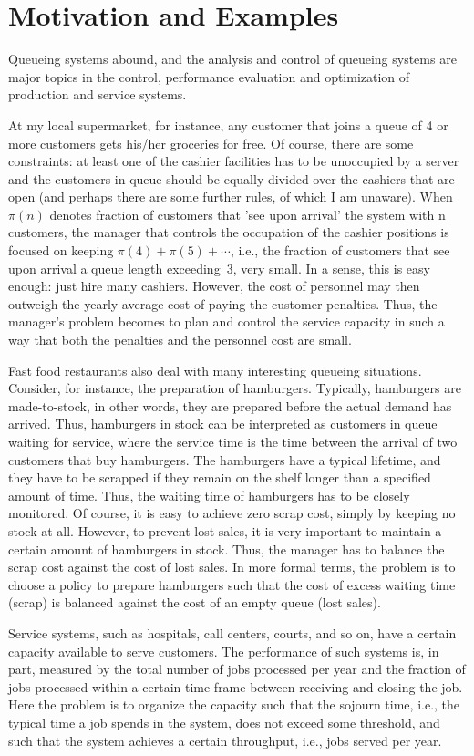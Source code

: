 \section*{Motivation and Examples}
Queueing systems abound, and the analysis and control of queueing systems are major topics in the control, performance evaluation and optimization of production and service systems.


At my local supermarket, for instance, any customer that joins a queue of 4 or more customers gets his/her groceries for free.
Of course, there are some constraints: at least one of the cashier facilities has to be unoccupied by a server and the customers in queue should be equally divided over the cashiers that are open (and perhaps there are some further rules, of which I am unaware).
When $\pi(n)$ denotes fraction of customers that 'see upon arrival' the system with n customers, the manager that controls the occupation of the cashier positions is focused on keeping $\pi(4)+\pi(5)+\cdots$, i.e., the fraction of customers that see upon arrival a queue length exceeding~3, very small.
In a sense, this is easy enough: just hire many cashiers.
However, the cost of personnel may then outweigh the yearly average cost of paying the customer penalties.
Thus, the manager's problem becomes to plan and control the service capacity in such a way that both the penalties and the personnel cost are small.

Fast food restaurants also deal with many interesting queueing situations.
Consider, for instance, the preparation of hamburgers.
Typically, hamburgers are made-to-stock, in other words, they are prepared before the actual demand has arrived.
Thus, hamburgers in stock can be interpreted as customers in queue waiting for service, where the service time is the time between the arrival of two customers that buy hamburgers.
The hamburgers have a typical lifetime, and they have to be scrapped if they remain on the shelf longer than a specified amount of time.
Thus, the waiting time of hamburgers has to be closely monitored.
Of course, it is easy to achieve zero scrap cost, simply by keeping no stock at all.
However, to prevent lost-sales, it is very important to maintain a certain amount of hamburgers in stock.
Thus, the manager has to balance the scrap cost against the cost of lost sales.
In more formal terms, the problem is to choose a policy to prepare hamburgers such that the cost of excess waiting time (scrap) is balanced against the cost of an empty queue (lost sales).

Service systems, such as hospitals, call centers, courts, and so on, have a certain capacity available to serve customers.
The performance of such systems is, in part, measured by the total number of jobs processed per year and the fraction of jobs processed within a certain time frame between receiving and closing the job.
Here the problem is to organize the capacity such that the sojourn time, i.e., the typical time a job spends in the system, does not exceed some threshold, and such that the system achieves a certain throughput, i.e., jobs served per year.

